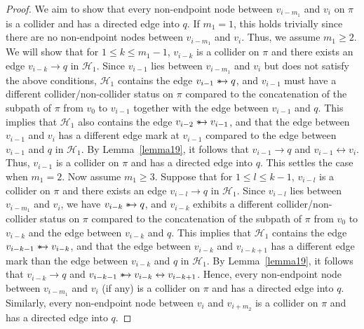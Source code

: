 \documentclass[accepted]{uai2025} %
\newcommand{\tuh}{\mathrel{\rightarrow}}
\newcommand{\huh}{\mathrel{\leftrightarrow}}
\newcommand{\suh}{\mathrel{{\ast\mkern-11mu\to}}}
\begin{document}
\begin{proof}
We aim to show that every non-endpoint node between $v_{i - m_1}$ and $v_i$ on $\pi$ is a collider and has a directed edge into $q$. If $m_1 = 1$, this holds trivially since there are no non-endpoint nodes between \( v_{i - m_1} \) and \( v_i \). Thus, we assume \( m_1 \geq 2 \). We will show that for \( 1 \leq k \leq m_1 - 1 \), $v_{i-k}$ is a collider on $\pi$ and there exists an edge \( v_{i - k} \tuh q \) in \( \mathcal{H}_1 \). Since \( v_{i - 1} \) lies between \( v_{i - m_1} \) and \( v_i \) but does not satisfy the above conditions, $\mathcal{H}_1$ contains the edge $v_{i-1}\suh q$, and $v_{i-1}$ must have a different collider/non-collider status on $\pi$ compared to the concatenation of the subpath of $\pi$ from $v_0$ to $v_{i-1}$ together with the edge between $v_{i-1}$ and $q$. This implies that $\mathcal{H}_1$ also contains the edge $v_{i-2} \suh v_{i-1}$, and that the edge between \( v_{i - 1} \) and \( v_i \) has a different edge mark at \( v_{i - 1} \) compared to the edge between \( v_{i - 1} \) and \( q \) in \( \mathcal{H}_1 \). By Lemma~\ref{lemma19}, it follows that \( v_{i - 1} \tuh q \) and \( v_{i - 1} \huh v_i \). Thus, $v_{i-1}$ is a collider on $\pi$ and has a directed edge into $q$. This settles the case when $m_1 = 2$. Now assume $m_1 \geq 3$. Suppose that for \( 1 \leq l \leq k - 1 \), $v_{i-l}$ is a collider on $\pi$ and there exists an edge \( v_{i - l} \tuh q \) in \( \mathcal{H}_1 \). Since \( v_{i - l} \) lies between \( v_{i - m_1} \) and \( v_i \), we have \( v_{i - k} \suh q \), and \( v_{i - k} \) exhibits a different collider/non-collider status on \( \pi \) compared to the concatenation of the subpath of \( \pi \) from \( v_0 \) to \( v_{i - k} \) and the edge between \( v_{i - k} \) and \( q \). This implies that $\mathcal{H}_1$ contains the edge $v_{i - k - 1} \suh v_{i - k}$, and that the edge between \( v_{i - k} \) and \( v_{i - k + 1} \) has a different edge mark than the edge between \( v_{i - k} \) and \( q \) in \( \mathcal{H}_1 \). By Lemma~\ref{lemma19}, it follows that \( v_{i - k} \tuh q \) and \( v_{i - k - 1} \suh v_{i - k} \huh v_{i - k + 1} \). Hence, every non-endpoint node between \( v_{i - m_1} \) and \( v_i \) (if any) is a collider on \( \pi \) and has a directed edge into $q$. Similarly, every non-endpoint node between \( v_i \) and \( v_{i + m_2} \) is a collider on \( \pi \) and has a directed edge into \( q \).


\end{proof}
\end{document}
